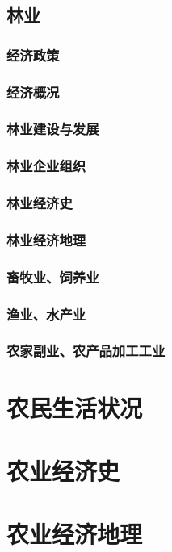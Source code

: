 \documentclass[UTF8]{../../RepresentationUniverse}
\begin{document}
    \subsection{林业}
        \subsubsection{经济政策}
        \subsubsection{经济概况}
        \subsubsection{林业建设与发展}
        \subsubsection{林业企业组织}
        \subsubsection{林业经济史}
        \subsubsection{林业经济地理}
        \subsubsection{畜牧业、饲养业}
    \subsubsection{渔业、水产业}
    \subsubsection{农家副业、农产品加工工业}
\section{农民生活状况}
\section{农业经济史}
\section{农业经济地理}
\end{document}
